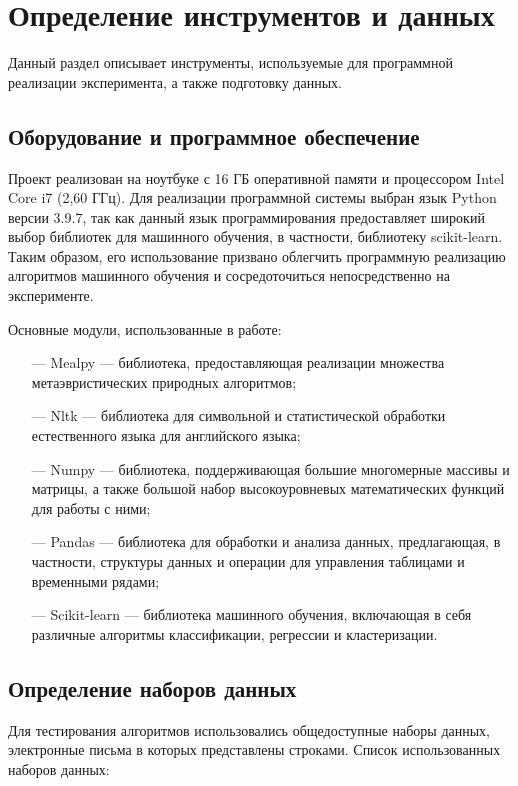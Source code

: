 \section{Определение инструментов и данных}

Данный раздел описывает инструменты, используемые для программной реализации эксперимента, а
также подготовку данных.

\subsection{Оборудование и программное обеспечение}

Проект реализован на ноутбуке с 16 ГБ оперативной памяти и процессором Intel Core i7 (2,60 ГГц).
Для реализации программной системы выбран язык Python версии 3.9.7, так как данный язык 
программирования предоставляет широкий выбор библиотек для машинного обучения, в частности,
библиотеку scikit-learn. Таким образом, его использование призвано облегчить программную
реализацию алгоритмов машинного обучения и сосредоточиться непосредственно на
эксперименте.

Основные модули, использованные в работе:

\begin{itemize}
    \item[—] Mealpy — библиотека, предоставляющая реализации множества метаэвристических природных алгоритмов;
    \item[—] Nltk — библиотека для символьной и статистической обработки естественного языка для английского языка;
    \item[—] Numpy — библиотека, поддерживающая большие многомерные массивы и матрицы, а также большой набор высокоуровневых математических функций для работы с ними;
    \item[—] Pandas — библиотека для обработки и анализа данных, предлагающая, в частности, структуры данных и операции для управления таблицами и временными рядами;
    \item[—] Scikit-learn — библиотека машинного обучения, включающая в себя различные алгоритмы классификации,
        регрессии и кластеризации.
\end{itemize}

\subsection{Определение наборов данных}\label{datasets}

Для тестирования алгоритмов использовались общедоступные наборы данных, электронные
письма в которых представлены строками.
Список использованных наборов данных:

